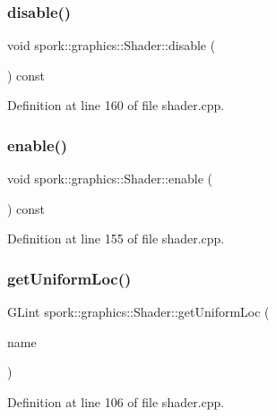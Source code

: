 \subsubsection{\texorpdfstring{disable()}{disable()}}
{\footnotesize\ttfamily void spork\+::graphics\+::\+Shader\+::disable (\begin{DoxyParamCaption}{ }\end{DoxyParamCaption}) const}



Definition at line 160 of file shader.\+cpp.

\mbox{\label{classspork_1_1graphics_1_1_shader_a9f94f59d4beda122f51475dc7d7eda07}} 
\subsubsection{\texorpdfstring{enable()}{enable()}}
{\footnotesize\ttfamily void spork\+::graphics\+::\+Shader\+::enable (\begin{DoxyParamCaption}{ }\end{DoxyParamCaption}) const}



Definition at line 155 of file shader.\+cpp.

\mbox{\label{classspork_1_1graphics_1_1_shader_a421e7428713f0d5e33f50ef0e9650185}} 
\subsubsection{\texorpdfstring{get\+Uniform\+Loc()}{getUniformLoc()}}
{\footnotesize\ttfamily G\+Lint spork\+::graphics\+::\+Shader\+::get\+Uniform\+Loc (\begin{DoxyParamCaption}\item[{const G\+Lchar $\ast$}]{name }\end{DoxyParamCaption})\hspace{0.3cm}{\ttfamily [private]}}



Definition at line 106 of file shader.\+cpp.

